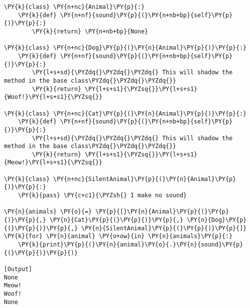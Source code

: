 \begin{Verbatim}[label=\makebox{\url{https://bitbucket.org/lbaldini/programming/src/tip/snippets/overload.py}},commandchars=\\\{\}]
\PY{k}{class} \PY{n+nc}{Animal}\PY{p}{:}
    \PY{k}{def} \PY{n+nf}{sound}\PY{p}{(}\PY{n+nb+bp}{self}\PY{p}{)}\PY{p}{:}
        \PY{k}{return} \PY{n+nb+bp}{None}

\PY{k}{class} \PY{n+nc}{Dog}\PY{p}{(}\PY{n}{Animal}\PY{p}{)}\PY{p}{:}
    \PY{k}{def} \PY{n+nf}{sound}\PY{p}{(}\PY{n+nb+bp}{self}\PY{p}{)}\PY{p}{:}
        \PY{l+s+sd}{\PYZdq{}\PYZdq{}\PYZdq{} This will shadow the method in the base class\PYZdq{}\PYZdq{}\PYZdq{}}
        \PY{k}{return} \PY{l+s+s1}{\PYZsq{}}\PY{l+s+s1}{Woof!}\PY{l+s+s1}{\PYZsq{}}
        
\PY{k}{class} \PY{n+nc}{Cat}\PY{p}{(}\PY{n}{Animal}\PY{p}{)}\PY{p}{:}
    \PY{k}{def} \PY{n+nf}{sound}\PY{p}{(}\PY{n+nb+bp}{self}\PY{p}{)}\PY{p}{:}
        \PY{l+s+sd}{\PYZdq{}\PYZdq{}\PYZdq{} This will shadow the method in the base class\PYZdq{}\PYZdq{}\PYZdq{}}
        \PY{k}{return} \PY{l+s+s1}{\PYZsq{}}\PY{l+s+s1}{Meow!}\PY{l+s+s1}{\PYZsq{}}

\PY{k}{class} \PY{n+nc}{SilentAnimal}\PY{p}{(}\PY{n}{Animal}\PY{p}{)}\PY{p}{:}
    \PY{k}{pass} \PY{c+c1}{\PYZsh{} I make no sound}
     
\PY{n}{animals} \PY{o}{=} \PY{p}{[}\PY{n}{Animal}\PY{p}{(}\PY{p}{)}\PY{p}{,} \PY{n}{Cat}\PY{p}{(}\PY{p}{)}\PY{p}{,} \PY{n}{Dog}\PY{p}{(}\PY{p}{)}\PY{p}{,} \PY{n}{SilentAnimal}\PY{p}{(}\PY{p}{)}\PY{p}{]}
\PY{k}{for} \PY{n}{animal} \PY{o+ow}{in} \PY{n}{animals}\PY{p}{:}
    \PY{k}{print}\PY{p}{(}\PY{n}{animal}\PY{o}{.}\PY{n}{sound}\PY{p}{(}\PY{p}{)}\PY{p}{)}

[Output]
None
Meow!
Woof!
None
\end{Verbatim}